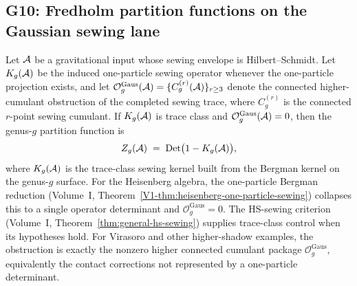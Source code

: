 \subsection{G10: Fredholm partition functions on the Gaussian sewing lane}

\begin{theorem}
Let $\mathcal{A}$ be a gravitational input whose sewing envelope is
Hilbert--Schmidt. Let \(K_g(\mathcal{A})\) be the induced one-particle sewing
operator whenever the one-particle projection exists, and let
\(\mathcal O^{\mathrm{Gaus}}_g(\mathcal{A})=\{C^{(r)}_g(\mathcal{A})\}_{r\ge3}\)
denote the connected higher-cumulant obstruction of the completed
sewing trace, where \(C^{(r)}_g\) is the connected \(r\)-point sewing
cumulant. If \(K_g(\mathcal{A})\) is trace class and
\(\mathcal O^{\mathrm{Gaus}}_g(\mathcal{A})=0\), then the genus-$g$ partition
function is
\begin{equation}%
Z_g(\cA) \;=\; \Det\bigl(1 - K_g(\cA)\bigr),
\end{equation}
where \(K_g(\mathcal{A})\) is the trace-class sewing kernel built from the
Bergman kernel on the genus-$g$ surface. For the Heisenberg algebra,
the one-particle Bergman reduction
(Volume~I, Theorem~\ref{V1-thm:heisenberg-one-particle-sewing})
collapses this to a single operator determinant and
\(\mathcal O^{\mathrm{Gaus}}_g=0\). The HS-sewing criterion
(Volume~I, Theorem~\ref{thm:general-hs-sewing}) supplies trace-class
control when its hypotheses hold. For Virasoro and other higher-shadow
examples, the obstruction is exactly the nonzero higher connected
cumulant package \(\mathcal O^{\mathrm{Gaus}}_g\), equivalently the
contact corrections not represented by a one-particle determinant.
\end{theorem}

